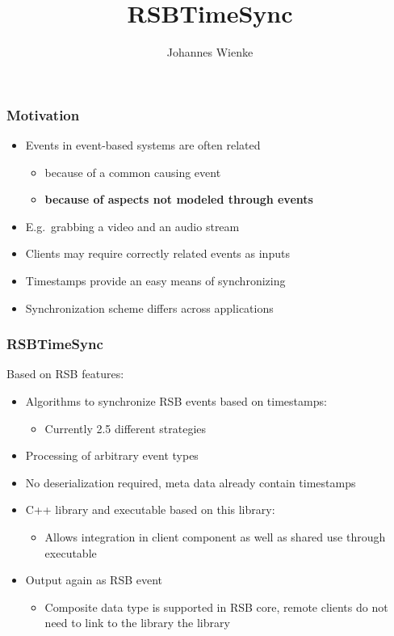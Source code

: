 \documentclass[hyperref={pdfpagelabels=false}]{beamer}
\title{RSBTimeSync}
\author{Johannes Wienke}
\institute{Bielefeld University}
\begin{document}
\begin{frame}
	\titlepage
\end{frame}

\begin{frame}
	\frametitle{Motivation}
	\begin{itemize}
        \item Events in event-based systems are often related
            \begin{itemize}
                \item because of a common causing event
                \item \textbf{because of aspects not modeled through events}
            \end{itemize}
        \item E.g.\ grabbing a video and an audio stream
        \item Clients may require correctly related events as inputs 
        \item Timestamps provide an easy means of synchronizing
        \item Synchronization scheme differs across applications
    \end{itemize}
\end{frame}

\begin{frame}
    \frametitle{RSBTimeSync}
    Based on RSB features:
    \begin{itemize}
        \item Algorithms to synchronize RSB events based on timestamps:
            \begin{itemize}
                \item Currently 2.5 different strategies
            \end{itemize}
        \item Processing of arbitrary event types
        \item No deserialization required, meta data already contain timestamps
        \item C++ library and executable based on this library:
            \begin{itemize}
                \item Allows integration in client component as well as shared use through executable
            \end{itemize}
        \item Output again as RSB event
            \begin{itemize}
                \item Composite data type is supported in RSB core, remote clients do not need to link to the library the library
            \end{itemize}
    \end{itemize}
\end{frame}
\end{document}
